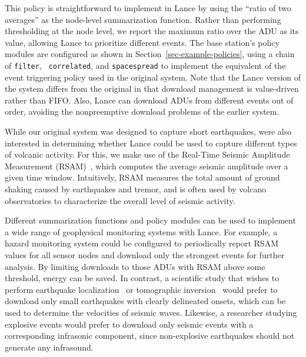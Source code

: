 This policy is straightforward to implement in Lance by using the ``ratio of
two averages'' as the node-level summarization function.  Rather than
performing thresholding at the node level, we report the maximum ratio over
the ADU as its value, allowing Lance to prioritize different events. The base
station's policy modules are configured as shown in
Section~\ref{sec-example-policies}, using a chain of {\tt filter}, {\tt
correlated}, and {\tt spacespread} to implement the equivalent of the event
triggering policy used in the original system. Note that the Lance version of
the system differs from the original in that download management is
value-driven rather than FIFO. Also, Lance can download ADUs from different
events out of order, avoiding the nonpreemptive download problems of the
earlier system.

While our original system was designed to capture short earthquakes,
were also interested in determining whether Lance could be used to
capture different types of volcanic activity. For this, we make use of
the Real-Time Seismic Amplitude Measurement (RSAM)~\cite{rsam}, which
computes the average seismic amplitude over a given time window. 
Intuitively, RSAM measures 
the total amount of ground shaking caused by earthquakes and tremor,
and is often used by volcano
observatories to characterize the overall level of seismic activity.

Different summarization functions and policy modules can be used to implement
a wide range of geophysical monitoring systems with Lance. For example, a
hazard monitoring system could be configured to periodically report RSAM
values for all sensor nodes and download only the strongest events for
further analysis. By limiting downloads to those ADUs with RSAM above some
threshold, energy can be saved. In contrast, a scientific study that wishes
to perform earthquake localization~\cite{aki-richards-80} or tomographic
inversion~\cite{lees-lindley-94} would prefer to download only small
earthquakes with clearly delineated onsets, which can be used to determine
the velocities of seismic waves. Likewise, a researcher studying explosive
events would prefer to download only seismic events with a corresponding
infrasonic component, since non-explosive earthquakes should not generate any
infrasound.

